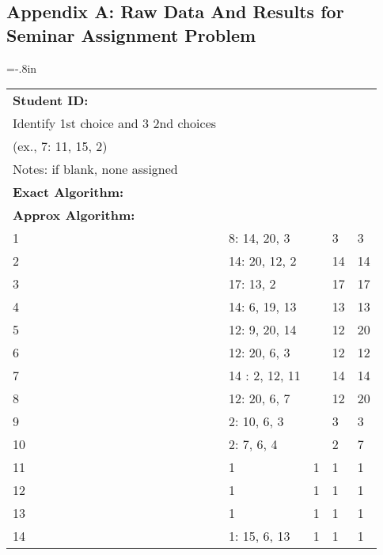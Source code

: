 \documentclass{article} %
\begin{document}
\subsection*{Appendix A: Raw Data And Results for Seminar Assignment Problem}
\hoffset=-.8in
\begin{longtable}{| l | l | l | l | l |}
\hline
        {\bf Student ID:} & \begin{tabular}{@{}c@{}}{\bf Student Selection:}\\ {\small Identify 1st choice and 3 2nd choices}\\(ex., 7:  11, 15, 2)\end{tabular}& \begin{tabular}{@{}c@{}}{\bf Assigned by Hand:}\\ {\footnotesize Notes: if blank, none assigned}\end{tabular} & \begin{tabular}{@{}c@{}}{\bf Assigned by}\\{\bf Exact Algorithm:}\end{tabular} & \begin{tabular}{@{}c@{}}{\bf Assigned by}\\{\bf Approx Algorithm:}\end{tabular} \\ \hline
        1 & 8: 14, 20, 3 &  & 3 & 3 \\ \hline
        2 & 14: 20, 12, 2 &  & 14 & 14 \\ \hline
        3 & 17: 13, 2 &  & 17 & 17 \\ \hline
        4 & 14: 6, 19, 13 &  & 13 & 13 \\ \hline
        5 & 12: 9, 20, 14 &  & 12 & 20 \\ \hline
        6 & 12: 20, 6, 3 &  & 12 & 12 \\ \hline
        7 & 14 : 2, 12, 11 &  & 14 & 14 \\ \hline
        8 & 12: 20, 6, 7 &  & 12 & 20 \\ \hline
        9 & 2: 10, 6, 3 &  & 3 & 3 \\ \hline
        10 & 2: 7, 6, 4 &  & 2 & 7 \\ \hline
        11 & 1 & 1 & 1 & 1 \\ \hline
        12 & 1 & 1 & 1 & 1 \\ \hline
        13 & 1 & 1 & 1 & 1 \\ \hline
        14 & 1: 15, 6, 13 & 1 & 1 & 1 \\ \hline

\end{longtable}
\end{document}

